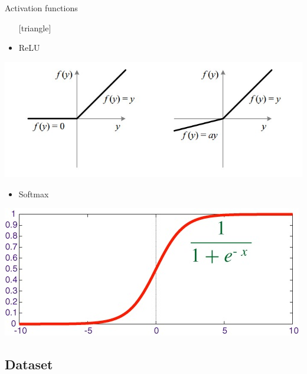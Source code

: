 \documentclass{beamer}
\begin{document}
\begin{frame}{Activation functions}
\begin{itemize}
\setlength\itemsep{1em}
[triangle]
\item ReLU
\end{itemize}
\begin{center}
\includegraphics[scale=0.2]{ReLU}
\end{center}
\begin{itemize}
\setlength\itemsep{1em}
[triangle]
\item Softmax
\end{itemize}
\begin{center}
\includegraphics[scale=0.2]{softmax1}
\end{center}
\end{frame}


\subsection{Dataset}
\end{document}
